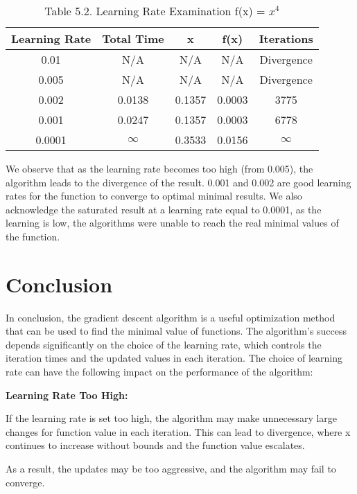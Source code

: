 \documentclass[12pt]{article}
\begin{document}
\begin{table}[htbp]
    \caption{Table 5.2. Learning Rate Examination f(x) = \( x^4 \)}
    \centering
    \begin{tabular}{|c|c|c|c|c|}
        \hline
        Learning Rate & Total Time & x & f(x) & Iterations  \\ 
        \hline
        0.01 & N/A & N/A & N/A & Divergence \\ 
        \hline
        0.005 & N/A & N/A & N/A & Divergence \\ 
        \hline
        0.002 & 0.0138 & 0.1357 &  0.0003  & 3775\\
        \hline
        0.001 & 0.0247 & 0.1357 &  0.0003  & 6778\\
        \hline 
        0.0001 & $\infty$ & 0.3533 & 0.0156 & $\infty$ \\
        \hline
    \end{tabular}
\end{table}

We observe that as the learning rate becomes too high (from 0.005), the algorithm leads to the divergence of the result. 0.001 and 0.002 are good learning rates for the function to converge to optimal minimal results. We also acknowledge the saturated result at a learning rate equal to 0.0001, as the learning is low, the algorithms were unable to reach the real minimal values of the function.

\section{Conclusion}

In conclusion, the gradient descent algorithm is a useful optimization method that can be used to find the minimal value of functions. The algorithm's success depends significantly on the choice of the learning rate, which controls the iteration times and the updated values in each iteration. The choice of learning rate can have the following impact on the performance of the algorithm:

\textbf{Learning Rate Too High:}

If the learning rate is set too high, the algorithm may make unnecessary large changes for function value in each iteration. This can lead to divergence, where x continues to increase without bounds and the function value escalates. 

As a result, the updates may be too aggressive, and the algorithm may fail to converge.
\end{document}
